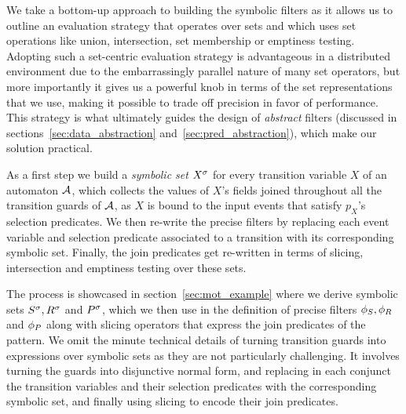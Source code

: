 We take a bottom-up approach to building the symbolic filters as it allows us 
to outline an evaluation strategy that operates over sets and which uses set 
operations like union, intersection, set membership or emptiness testing. 
Adopting such a set-centric evaluation strategy is advantageous in a 
distributed environment due to the embarrassingly parallel nature of many set 
operators, but more importantly it gives us a powerful knob in terms of the set 
representations that we use, making it possible to trade off precision in favor 
of performance. 
This strategy is what ultimately guides the design of {\em abstract} 
filters (discussed in sections~\ref{sec:data_abstraction} 
and~\ref{sec:pred_abstraction}), which make our solution practical.
   

As a first step we build a {\em symbolic set} ${X}^{\sigma}$ for every transition 
variable $X$ of an automaton $\mathcal{A}$, 
which collects the values of $X$'s fields joined throughout all the transition 
guards of $\mathcal{A}$, as $X$ is bound to the input events that satisfy $p_X$'s
selection predicates.
We then re-write the precise filters by replacing each event variable and 
selection predicate associated to a transition with its corresponding symbolic 
set.
Finally, the join predicates get re-written in terms of slicing, intersection 
and emptiness testing over these sets.

The process is showcased in section~\ref{sec:mot_example} where we derive 
symbolic sets ${S}^{\sigma}, {R}^{\sigma}$ and ${P}^{\sigma}$, which we then use in the 
definition of precise filters $\phi_{S}, \phi_{R}$ and $\phi_{P}$ along with 
slicing operators that express the join predicates of the pattern.
We omit the minute technical details of turning transition guards into 
expressions over symbolic sets as they are not particularly challenging.
It involves turning the guards into disjunctive normal form, and replacing in 
each conjunct the transition variables and their selection predicates with the 
corresponding symbolic set, and finally using slicing to encode their join 
predicates.    

